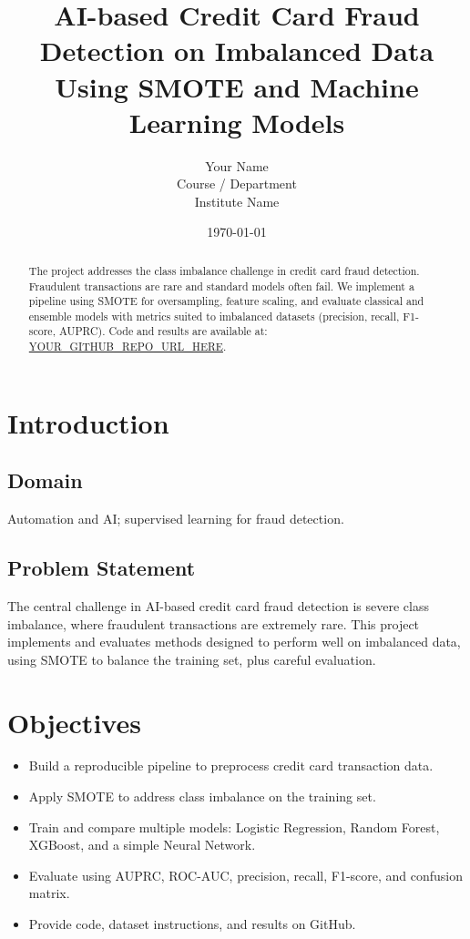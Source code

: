 \documentclass[12pt,a4paper]{article}
\title{AI-based Credit Card Fraud Detection on Imbalanced Data\\
{\large Using SMOTE and Machine Learning Models}}
\author{Your Name \\ Course / Department \\ Institute Name}
\date{\today}
\begin{document}
\maketitle

\begin{abstract}
The project addresses the class imbalance challenge in credit card fraud detection. Fraudulent transactions are rare and standard models often fail. We implement a pipeline using SMOTE for oversampling, feature scaling, and evaluate classical and ensemble models with metrics suited to imbalanced datasets (precision, recall, F1-score, AUPRC). Code and results are available at: \url{YOUR_GITHUB_REPO_URL_HERE}.
\end{abstract}

\section{Introduction}
\subsection{Domain}
Automation and AI; supervised learning for fraud detection.

\subsection{Problem Statement}
The central challenge in AI-based credit card fraud detection is severe class imbalance, where fraudulent transactions are extremely rare. This project implements and evaluates methods designed to perform well on imbalanced data, using SMOTE to balance the training set, plus careful evaluation.

\section{Objectives}
\begin{itemize}
  \item Build a reproducible pipeline to preprocess credit card transaction data.
  \item Apply SMOTE to address class imbalance on the training set.
  \item Train and compare multiple models: Logistic Regression, Random Forest, XGBoost, and a simple Neural Network.
  \item Evaluate using AUPRC, ROC-AUC, precision, recall, F1-score, and confusion matrix.
  \item Provide code, dataset instructions, and results on GitHub.
\end{itemize}
\end{document}
